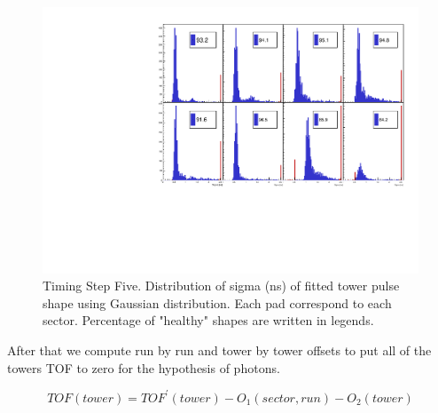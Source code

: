 \documentclass{article}
\begin{document}
\begin{figure}
\includegraphics[width=\textwidth]{fig_pi0vn/sigmaTOF.pdf}
\caption{Timing Step Five. Distribution of sigma (ns) of fitted tower pulse shape using Gaussian distribution. Each pad correspond to each sector. Percentage of "healthy" shapes are written in legends.}
\label{fig.tim.five.three}
\end{figure}
After that we compute run by run and tower by tower offsets to put all of the towers TOF to zero for the hypothesis of photons.

$$TOF(tower) = TOF^{'}(tower) - O_1(sector,run) - O_2(tower)$$
\end{document}
